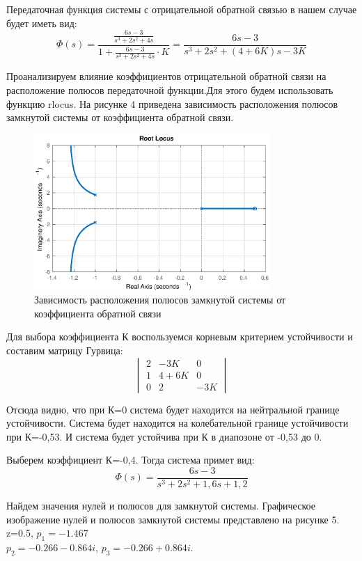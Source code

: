 \documentclass[12pt, a4paper]{article}
\begin{document}
Передаточная функция системы с  отрицательной обратной связью в нашем случае будет иметь вид:
\begin{equation}
\Phi(s) = \frac{\displaystyle{\frac{6s - 3}{s^3 + 2s^2 + 4s}}}{1 + \displaystyle{\frac{6s - 3}{s^3 + 2s^2 + 4s}}\cdot K} = \frac{6s - 3}{s^3 + 2s^2 + (4 + 6K)s - 3K}
\end{equation}\par
\par Проанализируем влияние коэффициентов отрицательной обратной связи на расположение полюсов передаточной функции.Для этого будем использовать
функцию rlocus. На рисунке 4 приведена зависимость расположения полюсов замкнутой системы от коэффициента обратной связи.
\begin{figure}[H]
\centering
\includegraphics[width=0.8\textwidth]{1/rlocus.eps}
\caption{Зависимость расположения полюсов замкнутой системы от коэффициента обратной связи}
\end{figure}

Для выбора коэффициента К воспользуемся корневым критерием устойчивости и составим матрицу Гурвица:
\[
\begin{vmatrix}
2 & -3K & 0\\
1 & 4+6K & 0\\
0 & 2 & -3K
\end{vmatrix}
\]
\par Отсюда видно, что при К=0 система будет находится на нейтральной границе устойчивости. Система будет находится на колебательной границе 
устойчивости при К=-0,53. И система будет устойчива при К в диапозоне от -0,53 до 0.
\par Выберем коэффициент К=-0,4. Тогда система примет вид:
\begin{equation}
\Phi(s) = \frac{6s - 3}{s^3 + 2s^2 + 1,6s + 1,2}
\end{equation}
\par Найдем значения нулей и полюсов для замкнутой системы. Графическое изображение нулей и полюсов замкнутой системы представлено на рисунке 5.
\\z=0.5, $p_{1}=-1.467$ 
\\$p_{2}=-0.266-0.864i$, $p_{3}=-0.266+0.864i$.
\end{document}
